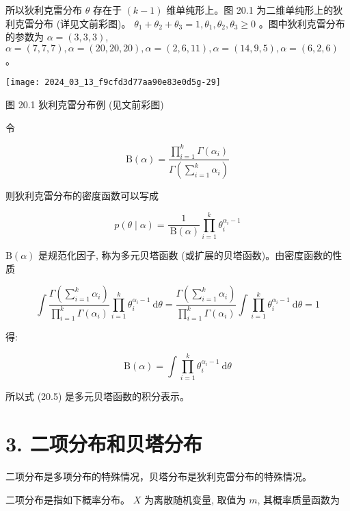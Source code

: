 \documentclass[10pt]{article}
\begin{document}
\begin{CJK*}{UTF8}{bsmi}
所以狄利克雷分布 $\theta$ 存在于 $(k-1)$ 维单纯形上。图 20.1 为二维单纯形上的狄利克雷分布 (详见文前彩图)。 $\theta_{1}+\theta_{2}+\theta_{3}=1, \theta_{1}, \theta_{2}, \theta_{3} \geqslant 0$ 。图中狄利克雷分布的参数为 $\alpha=(3,3,3)$, $\alpha=(7,7,7), \alpha=(20,20,20), \alpha=(2,6,11), \alpha=(14,9,5), \alpha=(6,2,6)$ 。

\begin{center}
\texttt{[image: 2024\_03\_13\_f9cfd3d77aa90e83e0d5g-29]}
\end{center}

图 20.1 狄利克雷分布例 (见文前彩图)

令


\begin{equation*}
\mathrm{B}(\alpha)=\frac{\prod_{i=1}^{k} \Gamma\left(\alpha_{i}\right)}{\Gamma\left(\sum_{i=1}^{k} \alpha_{i}\right)} \tag{20.3}
\end{equation*}


则狄利克雷分布的密度函数可以写成


\begin{equation*}
p(\theta \mid \alpha)=\frac{1}{\mathrm{~B}(\alpha)} \prod_{i=1}^{k} \theta_{i}^{\alpha_{i}-1} \tag{20.4}
\end{equation*}


$\mathrm{B}(\alpha)$ 是规范化因子, 称为多元贝塔函数 (或扩展的贝塔函数)。由密度函数的性质

$$
\int \frac{\Gamma\left(\sum_{i=1}^{k} \alpha_{i}\right)}{\prod_{i=1}^{k} \Gamma\left(\alpha_{i}\right)} \prod_{i=1}^{k} \theta_{i}^{\alpha_{i}-1} \mathrm{~d} \theta=\frac{\Gamma\left(\sum_{i=1}^{k} \alpha_{i}\right)}{\prod_{i=1}^{k} \Gamma\left(\alpha_{i}\right)} \int \prod_{i=1}^{k} \theta_{i}^{\alpha_{i}-1} \mathrm{~d} \theta=1
$$

得:


\begin{equation*}
\mathrm{B}(\alpha)=\int \prod_{i=1}^{k} \theta_{i}^{\alpha_{i}-1} \mathrm{~d} \theta \tag{20.5}
\end{equation*}


所以式 (20.5) 是多元贝塔函数的积分表示。

\section*{3. 二项分布和贝塔分布}
二项分布是多项分布的特殊情况，贝塔分布是狄利克雷分布的特殊情况。

二项分布是指如下概率分布。 $X$ 为离散随机变量, 取值为 $m$, 其概率质量函数为


\end{CJK*}
\end{document}
